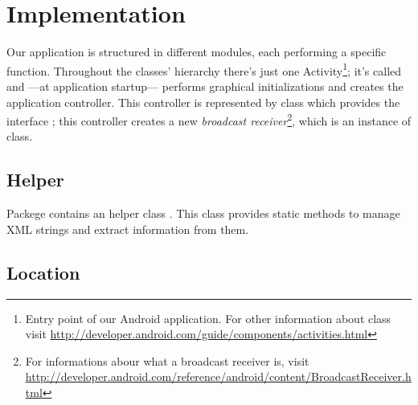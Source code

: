 \section{Implementation}
\label{sec:implementation}

Our application is structured in different modules, each performing a specific function. 
Throughout the classes' hierarchy there's just one Activity\footnote{Entry point of our Android application. For other information about  class visit \url{http://developer.android.com/guide/components/activities.html}}; it's called  and —at application startup— performs graphical initializations and creates the application controller. This controller is represented by  class which provides the interface ; this controller creates a new \textit{broadcast receiver}\footnote{For informations abour what a broadcast receiver is, visit \url{http://developer.android.com/reference/android/content/BroadcastReceiver.html}}, which is an instance of  class.


\subsection{Helper}
Packege  contains an helper class . This class provides static methods to manage XML strings and extract information from them.

\subsection{Location}


